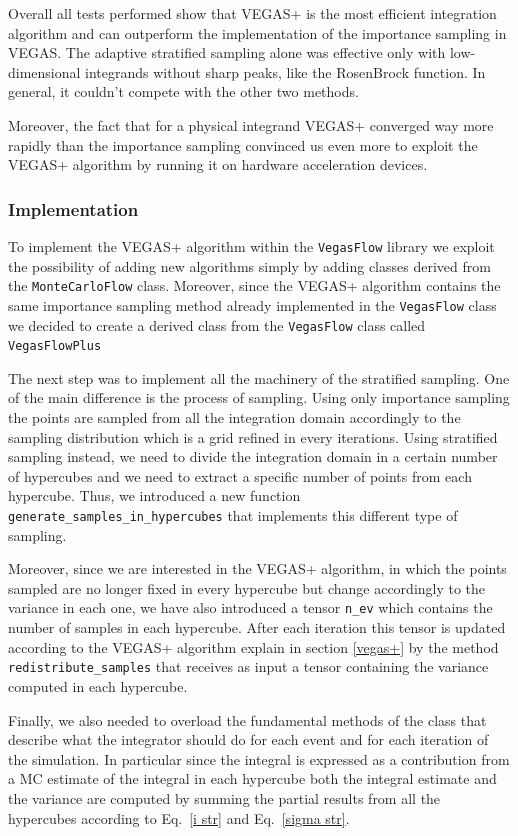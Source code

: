 \documentclass[../main/main.tex]{subfiles}
\begin{document}
Overall all tests performed show that VEGAS+ is  the most efficient integration algorithm and can outperform the implementation of the importance sampling in VEGAS. The adaptive stratified sampling alone was effective only with low-dimensional integrands without sharp peaks, like the RosenBrock function. In general, it couldn't compete with the other two methods.

Moreover, the fact that for a physical integrand VEGAS+ converged way more rapidly than the importance sampling convinced us even more to exploit the VEGAS+ algorithm by running it on hardware acceleration devices.


\subsubsection{Implementation}
To implement the VEGAS+ algorithm within the \texttt{VegasFlow} library we exploit the possibility of adding new algorithms simply by
adding classes derived from the \texttt{MonteCarloFlow} class. Moreover, since the VEGAS+ algorithm contains the same importance sampling method already implemented in the \texttt{VegasFlow} class we decided to create a derived class from the \texttt{VegasFlow} class called \texttt{VegasFlowPlus}

The next step was to implement all the machinery of the stratified sampling. 
One of the main difference is the process of sampling. Using only importance sampling the points are sampled from all the integration domain accordingly to the sampling distribution which is a grid refined in every iterations. Using stratified sampling instead, we need to divide the integration domain in a certain number of hypercubes and we need to extract a specific number of points from each hypercube. 
Thus, we introduced a new function \texttt{generate\_samples\_in\_hypercubes} that implements this different type of sampling.

Moreover, since we are interested in the VEGAS+ algorithm, in which the points sampled are no longer fixed in every hypercube but change accordingly to the variance in each one, we have also introduced a tensor \texttt{n\_ev} which contains the number of samples in each hypercube. 
After each iteration this tensor is updated according to the VEGAS+ algorithm explain in section \ref{vegas+} by the method \texttt{redistribute\_samples} that receives as input a tensor containing the variance computed in each hypercube.

Finally, we also needed to overload the fundamental methods of the class that describe what the integrator should do for each event and for each iteration of the simulation. In particular since the integral is expressed as a contribution from a MC estimate of the integral in each hypercube both the integral estimate and the variance are computed by summing the partial results from all the hypercubes according to Eq.~\ref{i str} and Eq.~\ref{sigma str}.
\end{document}
